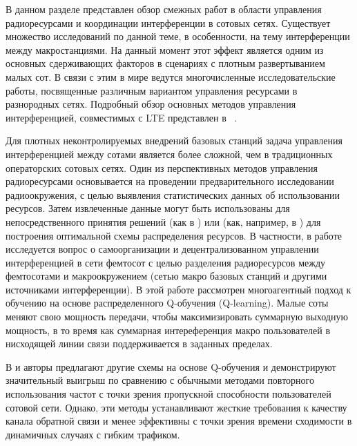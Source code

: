 В данном разделе представлен обзор смежных работ в области управления радиоресурсами и координации интерференции в сотовых сетях. Существует множество исследований по данной теме, в особенности, на тему интерференции между макростанциями. На данный момент этот эффект является одним из основных сдерживающих факторов в сценариях с плотным развертыванием малых сот. В связи с этим в мире ведутся многочисленные исследовательские работы, посвященные различным вариантом управления ресурсами в разнородных сетях. Подробный обзор основных методов управления интерференцией, совместимых с LTE представлен в ~\cite{cite_overview}.

Для плотных неконтролируемых внедрений базовых станций задача управления интерференцией между сотами является более сложной, чем в традиционных операторских сотовых сетях. Один из перспективных методов управления радиоресурсами основывается на проведении предварительного исследовании радиоокружения, с целью выявления статистических данных об использовании ресурсов. Затем извлеченные данные могут быть использованы для непосредственного принятия решений (как в \cite{mab}) или (как, например, в \cite{q-learning}) для построения оптимальной схемы распределения ресурсов. В частности, в работе~\cite{q-learning} исследуется вопрос о самоорганизации и децентрализованном управлении интерференцией в сети фемтосот с целью разделения радиоресурсов между фемтосотами и макроокружением (сетью макро базовых станций и другими источниками интерференции). В этой работе рассмотрен многоагентный подход к обучению на основе распределенного Q-обучения (Q-learning). Малые соты меняют свою мощность передачи, чтобы максимизировать суммарную выходную мощность, в то время как суммарная интереференция макро пользователей в нисходящей линии связи поддерживается в заданных пределах.

В \cite{mp-qlearning} и \cite{fzq-learning} авторы предлагают другие схемы на основе Q-обучения и демонстрируют значительный выигрыш по сравнению с обычными методами повторного использования частот с точки зрения пропускной способности пользователей сотовой сети. Однако, эти методы устанавливают жесткие требования к качеству канала обратной связи и менее эффективны с точки зрения времени сходимости в динамичных случаях с гибким трафиком. 

